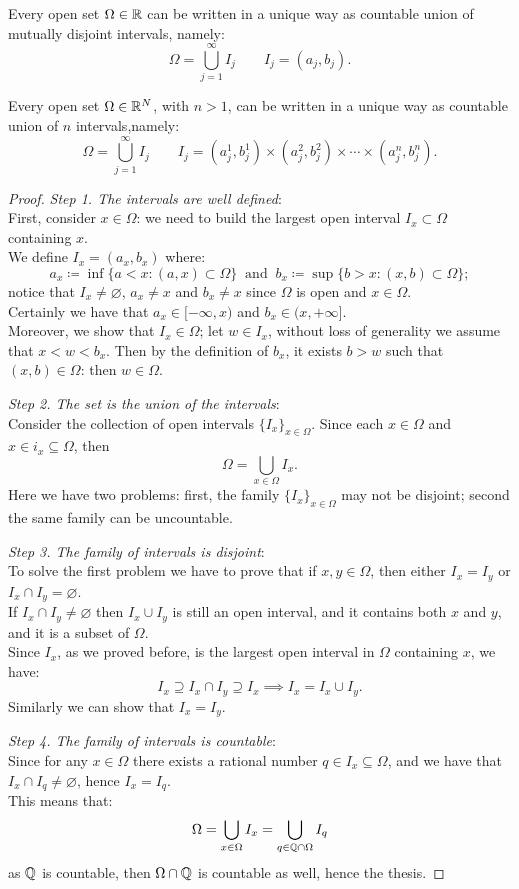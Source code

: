 \begin{theo} \label{open-set-RR-intervals}
	Every open set $\Omega \in \mathbb R$ can be written in a unique way as countable union of mutually disjoint intervals, namely: $$\Omega = \bigcup_{j=1}^{\infty} I_j \qquad I_j=\left(a_j,b_j\right).$$
	
	Every open set $\Omega \in \mathbb R^N$, with $n>1$, can be written in a unique way as countable union of $n$ intervals,namely:
	$$\Omega = \bigcup_{j=1}^{\infty} I_j \qquad I_j=\left(a_j^1,b_j^1\right)\times\left(a_j^2,b_j^2\right)\times\cdots\times\left(a_j^n,b_j^n\right).$$
\end{theo}
\begin{proof}
	\textit{Step 1. The intervals are well defined}:\\
	First, consider $x \in \Omega$: we need to build the largest open interval $I_x\subset \Omega$ containing $x$.\\
	We define $I_x = (a_x,b_x)$ where:
	$$ 
		a_x 
		\coloneqq \inf \{a < x: (a,x) \subset \Omega \} \ 
		\text{ and } \ b_x \coloneqq \sup \{b>x:(x,b) \subset \Omega \}
	;
	$$
	notice that $I_x \neq \varnothing$, $a_x \neq x$  and $b_x \neq x$ since $\Omega$ is open and $x \in \Omega$.\\
	Certainly we have that $a_x \in [-\infty, x)$ and $b_x \in (x, +\infty]$.\\
	Moreover, we show that $I_x \in \Omega$; let $w \in I_x$, without loss of generality we assume that $x < w < b_x$. Then by the definition of $b_x$, it exists $b > w$ such that $(x,b) \in \Omega$: then $w \in \Omega$.
	
	\textit{Step 2. The set is the union of the intervals}:\\
	Consider the collection of open intervals $\{I_x\}_{x\in \Omega}$. Since each $x\in \Omega$ and $x \in i_x \subseteq \Omega$, then 
	$$
		\Omega 
		= \bigcup_{x\in \Omega} I_x
	.
	$$
	Here we have two problems: first, the family $\{I_x\}_{x\in \Omega}$ may not be disjoint; second the same family can be uncountable.
	
	\textit{Step 3. The family of intervals is disjoint}:\\
	To solve the first problem we have to prove that if $x,y \in \Omega$, then either $I_x = I_y$ or $I_x \cap I_y = \varnothing$.\\
	If $I_x \cap I_y \neq \varnothing$ then $I_x \cup I_y$ is still an open interval, and it contains both $x$ and $y$, and it is a subset of $\Omega$.\\
	Since $I_x$, as we proved before, is the largest open interval in $\Omega$ containing $x$, we have:
	$$
		I_x \supseteq I_x \cap I_y \supseteq I_x 
		\implies I_x = I_x \cup I_y
	.
	$$
	Similarly we can show that $I_x = I_y$.
	
	\textit{Step 4. The family of intervals is countable}:\\
	Since for any $x\in \Omega$ there exists a rational number $q \in I_x \subseteq \Omega$, and we have that $I_x \cap I_q \neq \varnothing$, hence $I_x = I_q$.\\
	This means that: $$\Omega = \bigcup_{x\in\Omega} I_x = \bigcup_{q \in \mathbb Q \cap \Omega} I_q$$
	as $\mathbb Q$ is countable, then $\Omega \cap \mathbb Q$ is countable as well, hence the thesis.	
\end{proof}
